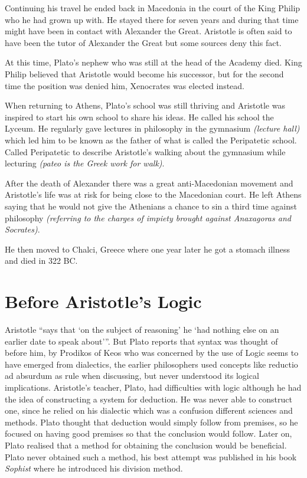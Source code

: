 \documentclass[12pt]{article}
\begin{document}
Continuing his travel he ended back in Macedonia in the court of the King Philip who he had grown up with.  He stayed there for seven years and during that time might have been in contact with Alexander the Great.  Aristotle is often said to have been the tutor of Alexander the Great but some sources deny this fact.\cite{OR}

At this time, Plato's nephew who was still at the head of the Academy died.  King Philip believed that Aristotle would become his successor, but for the second time the position was denied him, Xenocrates was elected instead.

When returning to Athens, Plato's school was still thriving and Aristotle was inspired to start his own school to share his ideas.  He called his school the Lyceum.\cite{IEP}  He regularly gave lectures in philosophy in the gymnasium \textit{(lecture hall)} which led him to be known as the father of what is called the Peripatetic school.\cite{BI}  Called Peripatetic to describe Aristotle's walking about the gymnasium while lecturing \textit{(pateo is the Greek work for walk)}.\cite{IEP}

After the death of Alexander there was a great anti-Macedonian movement and Aristotle's life was at risk for being close to the Macedonian court.  He left Athens saying that he would not give the Athenians a chance to sin a third time against philosophy \textit{(referring to the charges of impiety brought against Anaxagoras and Socrates)}.\cite{WA}

He then moved to Chalci, Greece where one year later he got a stomach illness and died in 322 BC.\cite{IEP}

\section*{Before Aristotle's Logic}

Aristotle ``says that `on the subject of reasoning' he `had nothing else on an earlier date to speak about'''\cite{BI}.  But Plato reports that syntax was thought of before him, by Prodikos of Keos who was concerned by the  use of \cite{BI}  Logic seems to have emerged from dialectics, the earlier philosophers used concepts like reductio ad absurdum as rule when discussing, but never understood its logical implications.\cite{BI}   Aristotle's teacher, Plato, had difficulties with logic although he had the idea of constructing a system for deduction.  He was never able to construct one, since he relied on his dialectic which was a confusion  different sciences and methods.\cite{BI}  Plato thought that deduction would simply follow from premises, so he focused on having good premises so that the conclusion would follow.  Later on, Plato realised that a method for obtaining the conclusion would be beneficial.  Plato never obtained such a method, his best attempt was published in his book \emph{Sophist} where he introduced his division method.\cite{RL}
\end{document}
